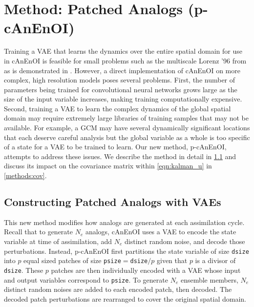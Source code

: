 \documentclass[final,3p]{elsarticle}
\theoremstyle{break}
\begin{document}
\section{Method: Patched Analogs (p-cAnEnOI)}\label{methods:patching}
Training a VAE that learns the dynamics over the entire spatial domain for use in cAnEnOI is feasible for small problems such as the multiscale Lorenz '96 from \cite{grooms2015framework} as is demonstrated in \cite{grooms2020analog}.
However, a direct implementation of cAnEnOI on more complex, high resolution models poses several problems.
First, the number of parameters being trained for convolutional neural networks grows large as the size of the input variable increases, making training computationally expensive.
Second, training a VAE to learn the complex dynamics of the global spatial domain may require extremely large libraries of training samples that may not be available.
For example, a GCM may have several dynamically significant locations that each deserve careful analysis but the global variable as a whole is too specific of a state for a VAE to be trained to learn.
Our new method, p-cAnEnOI, attempts to address these issues.
We describe the method in detail in \cref{methods:patching_d} and discuss its impact on the covariance matrix within \cref{eqn:kalman_u} in \cref{methods:cov}.

\subsection{Constructing Patched Analogs with VAEs}\label{methods:patching_d}
This new method modifies how analogs are generated at each assimilation cycle. 
Recall that to generate $N_e$ analogs, cAnEnOI uses a VAE to encode the state variable at time of assimilation, add $N_e$ distinct random noise, and decode those perturbations. 
Instead, p-cAnEnOI first partitions the state variable of size {\tt dsize} into $p$ equal sized patches of size {\tt psize}$=${\tt dsize}$/p$ given that $p$ is a divisor of {\tt dsize}.
These $p$ patches are then individually encoded with a VAE whose input and output variables correspond to {\tt psize}.
To generate $N_e$ ensemble members, $N_e$ distinct random noises are added to each encoded patch, then decoded. 
The decoded patch perturbations are rearranged to cover the original spatial domain.
\end{document}
